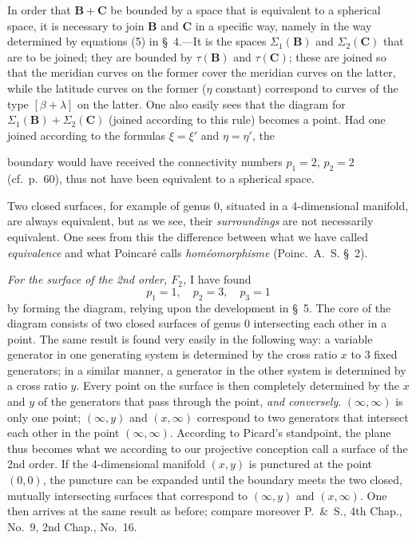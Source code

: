 \documentclass{article}
\begin{document}
In order that $\mathbf{B} + \mathbf{C}$ be bounded by a space that is equivalent to a spherical space, it is necessary to join $\mathbf{B}$ and $\mathbf{C}$ in a specific way, namely in the way determined by equations (5) in \S~4.---It is the spaces $\Sigma_1(\mathbf{B})$ and $\Sigma_2(\mathbf{C})$ that are to be joined; they are bounded by $\tau(\mathbf{B})$ and $\tau(\mathbf{C})$; these are joined so that the meridian curves on the former cover the meridian curves on the latter, while the latitude curves on the former ($\eta$ constant) correspond to curves of the type $[\beta + \lambda]$ on the latter. One also easily sees that the diagram for $\Sigma_1(\mathbf{B}) + \Sigma_2(\mathbf{C})$ (joined according to this rule) becomes a point. Had one joined according to the formulas $\xi = \xi'$ and $\eta = \eta'$, the

boundary would have received the connectivity numbers $p_1 = 2$, $p_2 = 2$ (cf.\ p.\ 60), thus not have been equivalent to a spherical space.

Two closed surfaces, for example of genus 0, situated in a 4-dimensional manifold, are always equivalent, but as we see, their \emph{surroundings} are not necessarily equivalent. One sees from this the difference between what we have called \emph{equivalence} and what Poincaré calls \emph{homéomorphisme} (Poinc.\ A.~S. \S~2).

\emph{For the surface of the 2nd order, $F_2$,} I have found
\[
p_1 = 1, \quad p_2 = 3, \quad p_3 = 1
\]
by forming the diagram, relying upon the development in \S~5. The core of the diagram consists of two closed surfaces of genus 0 intersecting each other in a point. The same result is found very easily in the following way: a variable generator in one generating system is determined by the cross ratio $x$ to 3 fixed generators; in a similar manner, a generator in the other system is determined by a cross ratio $y$. Every point on the surface is then completely determined by the $x$ and $y$ of the generators that pass through the point, \emph{and conversely}. $(\infty, \infty)$ is only one point; $(\infty, y)$ and $(x, \infty)$ correspond to two generators that intersect each other in the point $(\infty, \infty)$. According to Picard's standpoint, the plane thus becomes what we according to our projective conception call a surface of the 2nd order. If the 4-dimensional manifold $(x, y)$ is punctured at the point $(0, 0)$, the puncture can be expanded until the boundary meets the two closed, mutually intersecting surfaces that correspond to $(\infty, y)$ and $(x, \infty)$. One then arrives at the same result as before; compare moreover P.~\&~S., 4th Chap., No.~9, 2nd Chap., No.~16.
\end{document}
